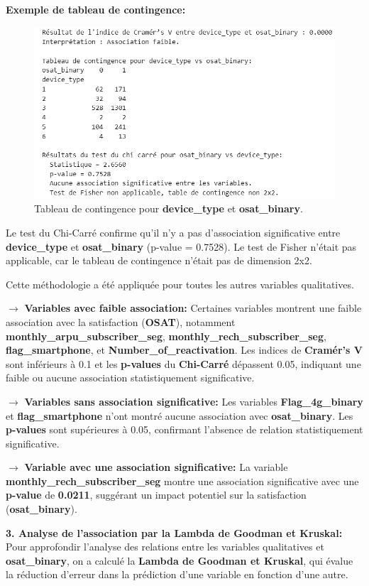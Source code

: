 \textbf{\checkmark Exemple de tableau de contingence:}

\begin{figure}[H]
    \centering
    \includegraphics[width=0.6\linewidth]{capture_sas_39.png}
    \caption{Tableau de contingence pour \textbf{device\_type} et \textbf{osat\_binary}.}
\end{figure}

Le test du Chi-Carré confirme qu'il n'y a pas d'association significative entre \textbf{device\_type} et \textbf{osat\_binary} (p-value = 0.7528). Le test de Fisher n'était pas applicable, car le tableau de contingence n'était pas de dimension 2x2.

Cette méthodologie a été appliquée pour toutes les autres variables qualitatives.

\textbf{\(\rightarrow\)} \textbf{Variables avec faible association:} Certaines variables montrent une faible association avec la satisfaction (\textbf{OSAT}), notamment \textbf{monthly\_arpu\_subscriber\_seg}, \textbf{monthly\_rech\_subscriber\_seg}, \textbf{flag\_smartphone}, et \textbf{Number\_of\_reactivation}. Les indices de \textbf{Cramér's V} sont inférieurs à 0.1 et les \textbf{p-values} du \textbf{Chi-Carré} dépassent 0.05, indiquant une faible ou aucune association statistiquement significative.


\textbf{\(\rightarrow\)} \textbf{Variables sans association significative:} Les variables \textbf{Flag\_4g\_binary} et \textbf{flag\_smartphone} n’ont montré aucune association avec \textbf{osat\_binary}. Les \textbf{p-values} sont supérieures à 0.05, confirmant l'absence de relation statistiquement significative.


\textbf{\(\rightarrow\)} \textbf{Variable avec une association significative:} La variable \textbf{monthly\_rech\_subscriber\_seg} montre une association significative avec une \textbf{p-value} de \textbf{0.0211}, suggérant un impact potentiel sur la satisfaction (\textbf{osat\_binary}).

\noindent \textbf{3. Analyse de l'association par la Lambda de Goodman et Kruskal:} Pour approfondir l'analyse des relations entre les variables qualitatives et \textbf{osat\_binary}, on a calculé la \textbf{Lambda de Goodman et Kruskal}, qui évalue la réduction d'erreur dans la prédiction d'une variable en fonction d'une autre.

